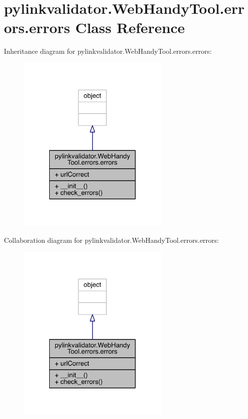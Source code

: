 \hypertarget{classpylinkvalidator_1_1_web_handy_tool_1_1errors_1_1errors}{}\section{pylinkvalidator.\+Web\+Handy\+Tool.\+errors.\+errors Class Reference}
\label{classpylinkvalidator_1_1_web_handy_tool_1_1errors_1_1errors}


Inheritance diagram for pylinkvalidator.\+Web\+Handy\+Tool.\+errors.\+errors\+:
\nopagebreak
\begin{figure}[H]
\begin{center}
\leavevmode
\includegraphics[width=210pt]{classpylinkvalidator_1_1_web_handy_tool_1_1errors_1_1errors__inherit__graph}
\end{center}
\end{figure}


Collaboration diagram for pylinkvalidator.\+Web\+Handy\+Tool.\+errors.\+errors\+:
\nopagebreak
\begin{figure}[H]
\begin{center}
\leavevmode
\includegraphics[width=210pt]{classpylinkvalidator_1_1_web_handy_tool_1_1errors_1_1errors__coll__graph}
\end{center}
\end{figure}
